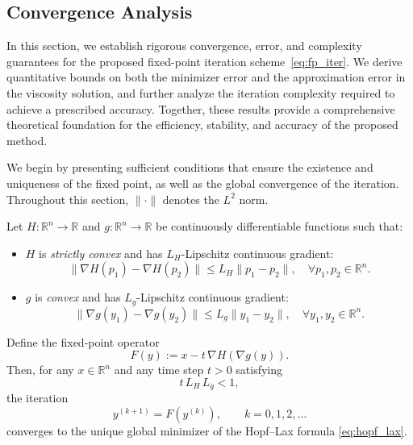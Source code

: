 \documentclass[review,hidelinks,onefignum,onetabnum]{siamart250106}
\begin{document}
\subsection{Convergence Analysis}
In this section, we establish rigorous convergence, error, and complexity guarantees for the proposed fixed-point iteration scheme~\eqref{eq:fp_iter}.
We derive quantitative bounds on both the minimizer error and the approximation error in the viscosity solution, and further analyze the iteration complexity required to achieve a prescribed accuracy.
Together, these results provide a comprehensive theoretical foundation for the efficiency, stability, and accuracy of the proposed method.

We begin by presenting sufficient conditions that ensure the existence and uniqueness of the fixed point, as well as the global convergence of the iteration. Throughout this section, $\|\cdot\|$ denotes the $L^2$ norm.



\begin{theorem}\label{thm:fixed_pt}
Let \( H: \mathbb{R}^n \to \mathbb{R} \) and \( g: \mathbb{R}^n \to \mathbb{R} \) be continuously differentiable functions such that:
\begin{itemize}
    \item \( H \) is \emph{strictly convex} and has \( L_H \)-Lipschitz continuous gradient:
    \[
    \|\nabla H(p_1) - \nabla H(p_2)\| \leq L_H \|p_1 - p_2\|, \quad \forall p_1, p_2 \in \mathbb{R}^n.
    \]
    \item \( g \) is \emph{convex} and has \( L_g \)-Lipschitz continuous gradient:
    \[
    \|\nabla g(y_1) - \nabla g(y_2)\| \leq L_g \|y_1 - y_2\|, \quad \forall y_1, y_2 \in \mathbb{R}^n.
    \]
\end{itemize}
Define the fixed-point operator
\[
    F(y) := x - t\, \nabla H(\nabla g(y)).
\]
Then, for any \(x \in \mathbb{R}^n\) and any time step \(t>0\) satisfying
\[
    t\, L_H\, L_g < 1,
\]
the iteration
\[
    y^{(k+1)} = F(y^{(k)}), \qquad k = 0,1,2,\dots
\]
converges to the unique global minimizer of the Hopf--Lax formula \eqref{eq:hopf_lax}.

\end{theorem}

\end{document}

